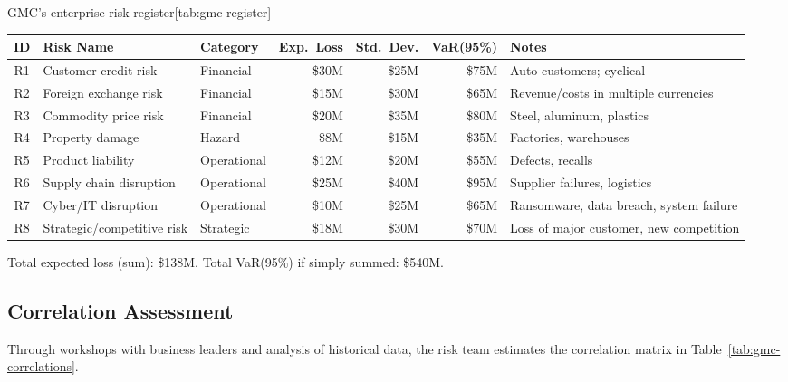 \documentclass[11pt,openany]{book}
\begin{document}
\begin{ermtable}{GMC's enterprise risk register}[tab:gmc-register]
\begin{tabularx}{\textwidth}{@{}cllrrrY@{}}
\toprule
\textbf{ID} & \textbf{Risk Name} & \textbf{Category} &
\textbf{Exp.\ Loss} & \textbf{Std.\ Dev.} & \textbf{VaR(95\%)} &
\textbf{Notes} \\
\midrule
R1 & Customer credit risk & Financial & \$30M & \$25M & \$75M & Auto customers; cyclical \\
R2 & Foreign exchange risk & Financial & \$15M & \$30M & \$65M & Revenue/costs in multiple currencies \\
R3 & Commodity price risk & Financial & \$20M & \$35M & \$80M & Steel, aluminum, plastics \\
R4 & Property damage & Hazard & \$8M & \$15M & \$35M & Factories, warehouses \\
R5 & Product liability & Operational & \$12M & \$20M & \$55M & Defects, recalls \\
R6 & Supply chain disruption & Operational & \$25M & \$40M & \$95M & Supplier failures, logistics \\
R7 & Cyber/IT disruption & Operational & \$10M & \$25M & \$65M & Ransomware, data breach, system failure \\
R8 & Strategic/competitive risk & Strategic & \$18M & \$30M & \$70M & Loss of major customer, new competition \\
\bottomrule
\end{tabularx}
\end{ermtable}

Total expected loss (sum): \$138M. Total VaR(95\%) if simply summed: \$540M.

\subsection{Correlation Assessment}
\label{subsec:gmc-correlations}

Through workshops with business leaders and analysis of historical data, the
risk team estimates the correlation matrix in Table~\ref{tab:gmc-correlations}.
\end{document}
